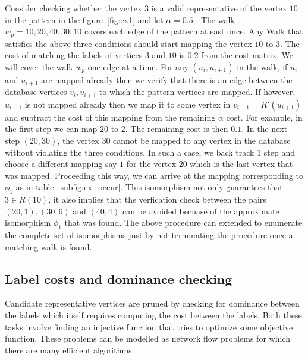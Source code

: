 Consider checking whether the vertex $3$ is a valid representative of the 
vertex $10$ in the pattern in the figure~\ref{fig:ex1} and let 
$\alpha = 0.5$ . The walk $ w_p = 10, 20, 40, 30, 10$
covers each edge of the pattern atleast once. Any Walk that satisfies the
above three conditions should start mapping the vertex $10$ to $3$. The cost of 
matching the labels of vertices $3$ and $10$ is $0.2$ from the cost matrix.
We will cover the walk $w_p$ one edge at a time. For any $(u_i, u_{i+1})$ in the walk, 
if $u_i$ and $u_{i+1}$ are mapped already then we verify that there is 
an edge between the database vertices $v_i, v_{i+1}$ to which the pattern vertices are mapped.
If however, $u_{i+1}$ is not mapped already then we map it to some vertex in $v_{i+1} = R'(u_{i+1})$
and subtract the cost of this mapping from the remaining $\alpha$ cost.
For example, in the first step we can map $20$ to $2$. The remaining
cost is then $0.1$. In the next step $(20,30)$, the vertex $30$
cannot be mapped to any vertex in the database without violating the three conditions.
In such a case, we back track 1 step and choose a different mapping say $1$
for the vertex $20$ which is the last vertex that was mapped. Proceeding this way, we can arrive
at the mapping corresponding to $\phi_{1}$ as in table~\ref{subfig:ex_occur}.
This isomorphism not only guarantees that $3 \in R(10)$, it also implies
that the verfication check between the pairs $(20, 1), (30, 6)$ and $(40, 4)$
can be avoided becuase of the approximate isomorphism $\phi_1$ that was found.
The above procedure can extended to enumerate the complete
set of isomorphisms just by not terminating the procedure once a matching walk
is found.



\subsection{Label costs and dominance checking}
Candidate representative vertices are pruned by checking for dominance between
the \ncl labels which itself requires computing the cost between the \khop labels.
Both these tasks involve finding an injective function that tries to optimize
some objective function. These problems can be modelled as network flow problems
for which there are many efficient algorithms. 

